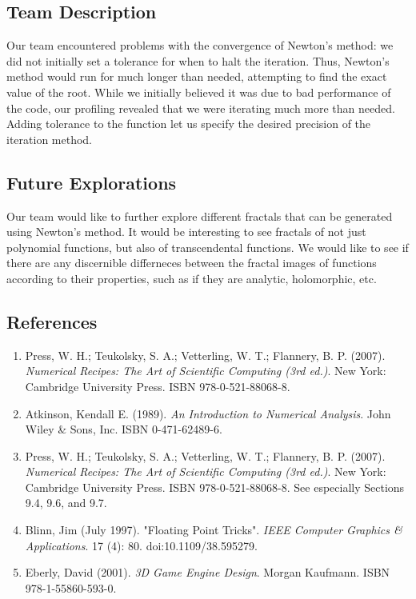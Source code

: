 \documentclass[11pt]{article}
\begin{document}
\subsection{Team Description}

Our team encountered problems with the convergence of Newton's method: we did not initially set a tolerance for when to halt the iteration. Thus, Newton's method would run for much longer than needed, attempting to find the exact value of the root. While we initially believed it was due to bad performance of the code, our profiling revealed that we were iterating much more than needed. Adding tolerance to the function let us specify the desired precision of the iteration method.

\subsection{Future Explorations}

Our team would like to further explore different fractals that can be generated using Newton's method. It would be interesting to see fractals of not just polynomial functions, but also of transcendental functions. We would like to see if there are any discernible differneces between the fractal images of functions according to their properties, such as if they are analytic, holomorphic, etc.

\subsection{References}

\begin{enumerate}

  \item Press, W. H.; Teukolsky, S. A.; Vetterling, W. T.; Flannery, B. P. (2007). \textit{Numerical Recipes: The Art of Scientific Computing (3rd ed.)}. New York: Cambridge University Press. ISBN 978-0-521-88068-8.
  
  \item Atkinson, Kendall E. (1989). \textit{An Introduction to Numerical Analysis}. John Wiley \& Sons, Inc. ISBN 0-471-62489-6.
  
  \item Press, W. H.; Teukolsky, S. A.; Vetterling, W. T.; Flannery, B. P. (2007). \textit{Numerical Recipes: The Art of Scientific Computing (3rd ed.)}. New York: Cambridge University Press. ISBN 978-0-521-88068-8. See especially Sections 9.4, 9.6, and 9.7.
  
  \item Blinn, Jim (July 1997). "Floating Point Tricks". \textit{IEEE Computer Graphics \& Applications}. 17 (4): 80. doi:10.1109/38.595279.
  
  \item Eberly, David (2001). \textit{3D Game Engine Design}. Morgan Kaufmann. ISBN 978-1-55860-593-0.
\end{enumerate}
\newpage
\end{document}
